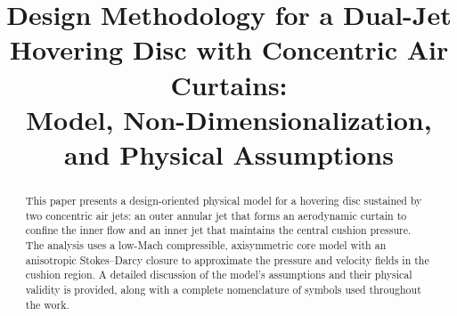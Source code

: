 \documentclass[11pt,a4paper]{article}
\title{Design Methodology for a Dual-Jet Hovering Disc with Concentric Air Curtains:\\
Model, Non-Dimensionalization, and Physical Assumptions}
\author{ }
\date{ }
\begin{document}
\maketitle

\begin{abstract}
This paper presents a design-oriented physical model for a hovering disc sustained by two concentric air jets:
an outer annular jet that forms an aerodynamic curtain to confine the inner flow and an inner jet that maintains the central cushion pressure.
The analysis uses a low-Mach compressible, axisymmetric core model with an anisotropic Stokes--Darcy closure to approximate the pressure and velocity fields in the cushion region.
A detailed discussion of the model's assumptions and their physical validity is provided, along with a complete nomenclature of symbols used throughout the work.
\end{abstract}
\end{document}
